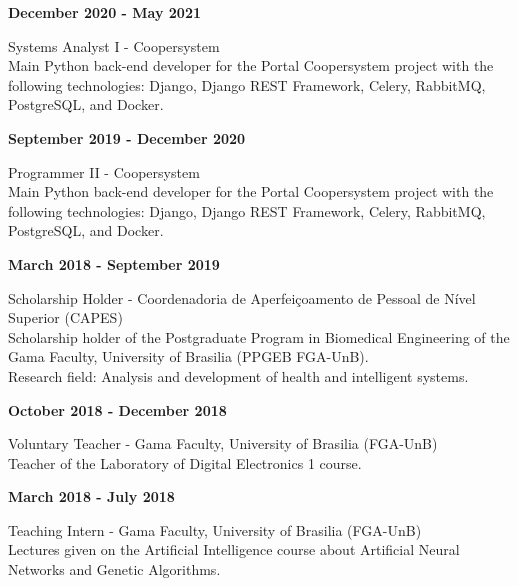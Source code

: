 \documentclass[11pt]{article}
\begin{document}
\newpage
\textbf{December 2020 - May 2021}
\begin{addmargin}{0.5cm}
    Systems Analyst I - Coopersystem\\
    Main Python back-end developer for the Portal Coopersystem project with the following technologies: Django, Django REST Framework, Celery, RabbitMQ, PostgreSQL, and Docker.\\
\end{addmargin}

\textbf{September 2019 - December 2020}
\begin{addmargin}{0.5cm}
Programmer II - Coopersystem\\
Main Python back-end developer for the Portal Coopersystem project with the following technologies: Django, Django REST Framework, Celery, RabbitMQ, PostgreSQL, and Docker.\\
\end{addmargin}


\textbf{March 2018 - September 2019}
\begin{addmargin}{0.5cm}
Scholarship Holder - Coordenadoria de Aperfeiçoamento de Pessoal de Nível Superior (CAPES)\\
Scholarship holder of the Postgraduate Program in Biomedical Engineering of the
Gama Faculty, University of Brasilia (PPGEB FGA-UnB).\\
Research field: Analysis and development of health and intelligent systems.\\
\end{addmargin}

\textbf{October 2018 - December 2018}
\begin{addmargin}{0.5cm}
Voluntary Teacher -  Gama Faculty, University of Brasilia (FGA-UnB)\\
Teacher of the Laboratory of Digital Electronics 1 course. \\
\end{addmargin}

\textbf{March 2018 - July 2018}
\begin{addmargin}{0.5cm}
Teaching Intern - Gama Faculty, University of Brasilia (FGA-UnB)\\
Lectures given on the Artificial Intelligence  course  about Artificial Neural Networks
and Genetic Algorithms. \\
\end{addmargin}
\end{document}
